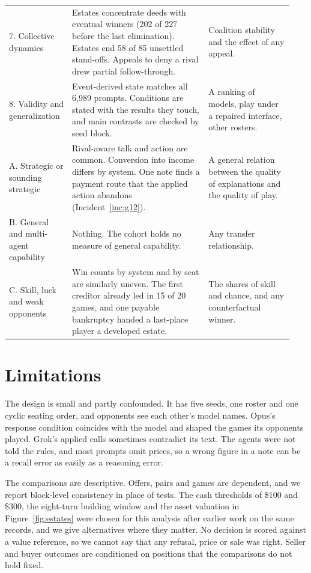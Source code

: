 \begin{longtable}{@{}L{0.20\linewidth}L{0.45\linewidth}L{0.29\linewidth}@{}}
7. Collective dynamics & Estates concentrate deeds with eventual winners (202 of 227 before the last elimination). Estates end 58 of 85 unsettled stand-offs. Appeals to deny a rival drew partial follow-through. & Coalition stability and the effect of any appeal.\\
8. Validity and generalization & Event-derived state matches all 6,989 prompts. Conditions are stated with the results they touch, and main contrasts are checked by seed block. & A ranking of models, play under a repaired interface, other rosters.\\
\midrule
A. Strategic or sounding strategic & Rival-aware talk and action are common. Conversion into income differs by system. One note finds a payment route that the applied action abandons (Incident~\ref{inc:g12}). & A general relation between the quality of explanations and the quality of play.\\
B. General and multi-agent capability & Nothing. The cohort holds no measure of general capability. & Any transfer relationship.\\
C. Skill, luck and weak opponents & Win counts by system and by seat are similarly uneven. The first creditor already led in 15 of 20 games, and one payable bankruptcy handed a last-place player a developed estate. & The shares of skill and chance, and any counterfactual winner.\\
\end{longtable}
\endgroup

\section{Limitations}
\label{sec:limits}

The design is small and partly confounded. It has five seeds, one roster and one cyclic seating order, and opponents see each other's model names. Opus's response condition coincides with the model and shaped the games its opponents played. Grok's applied calls sometimes contradict its text. The agents were not told the rules, and most prompts omit prices, so a wrong figure in a note can be a recall error as easily as a reasoning error.

The comparisons are descriptive. Offers, pairs and games are dependent, and we report block-level consistency in place of tests. The cash thresholds of \$100 and \$300, the eight-turn building window and the asset valuation in Figure~\ref{fig:estates} were chosen for this analysis after earlier work on the same records, and we give alternatives where they matter. No decision is scored against a value reference, so we cannot say that any refusal, price or sale was right. Seller and buyer outcomes are conditioned on positions that the comparisons do not hold fixed.

